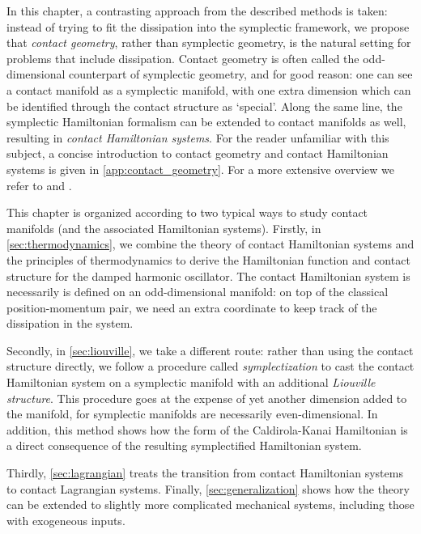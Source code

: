 In this chapter, a contrasting approach from the described methods is taken: instead of trying to fit the dissipation into the symplectic framework, we propose that \emph{contact geometry}, rather than symplectic geometry, is the natural setting for problems that include dissipation. Contact geometry is often called the odd-dimensional counterpart of symplectic geometry, and for good reason: one can see a contact manifold as a symplectic manifold, with one extra dimension which can be identified through the contact structure as `special'. Along the same line, the symplectic Hamiltonian formalism can be extended to contact manifolds as well, resulting in \emph{contact Hamiltonian systems}. For the reader unfamiliar with this subject, a concise introduction to contact geometry and contact Hamiltonian systems is given in \cref{app:contact_geometry}. For a more extensive overview we refer to \citet{Geiges2008} and \citet{Libermann1987}.

This chapter is organized according to two typical ways to study contact manifolds (and the associated Hamiltonian systems). Firstly, in \cref{sec:thermodynamics}, we combine the theory of contact Hamiltonian systems and the principles of thermodynamics to derive the Hamiltonian function and contact structure for the damped harmonic oscillator. The contact Hamiltonian system is necessarily is defined on an odd-dimensional manifold: on top of the classical position-momentum pair, we need an extra coordinate to keep track of the dissipation in the system. 

Secondly, in \cref{sec:liouville}, we take a different route: rather than using the contact structure directly, we follow a procedure called \emph{symplectization} to cast the contact Hamiltonian system on a symplectic manifold with an additional \emph{Liouville structure}. This procedure goes at the expense of yet another dimension added to the manifold, for symplectic manifolds are necessarily even-dimensional. 
In addition, this method shows how the form of the Caldirola-Kanai Hamiltonian is a direct consequence of the resulting symplectified Hamiltonian system.

Thirdly, \cref{sec:lagrangian} treats the transition from contact Hamiltonian systems to contact Lagrangian systems. Finally, \cref{sec:generalization} shows how the theory can be extended to slightly more complicated mechanical systems, including those with exogeneous inputs.

